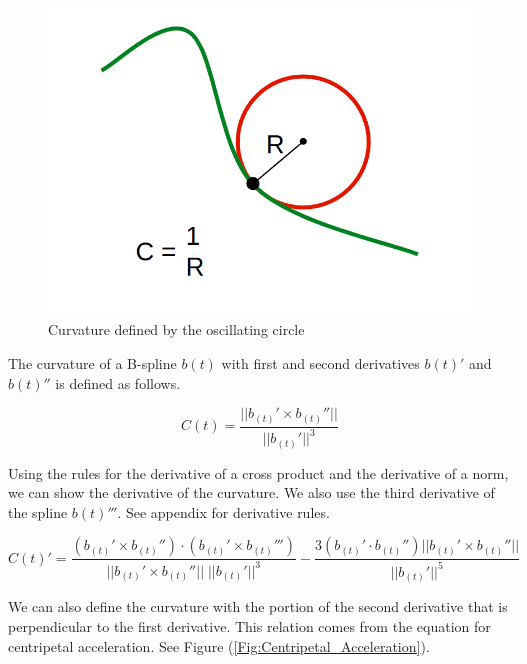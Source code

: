 \documentclass{article}
\begin{document}
\begin{figure}[h]
\begin{center}
\includegraphics[scale=.23]{Curvature.png}
\end{center}
\caption{Curvature defined by the oscillating circle}
\label{Fig:Curvature}
\end{figure}

The curvature of a B-spline \(b(t)\) with first and second derivatives \(b(t)'\) and \(b(t)''\) is defined as follows.

\begin{equation} \label{eq:curvature}
    C(t) = \frac{||b_{(t)}' \times b_{(t)}''||}{||b_{(t)}'||^3}
\end{equation}

Using the rules for the derivative of a cross product and the derivative of a norm, we can show the derivative of the curvature. We also use the third derivative of the spline \(b(t)'''\). See appendix for derivative rules.

\begin{equation}
    C(t)' = \frac{(b_{(t)}' \times b_{(t)}'') \cdot (b_{(t)}' \times b_{(t)}''')}{||b_{(t)}' \times b_{(t)}''||\;||b_{(t)}'||^3} - \frac{3(b_{(t)}' \cdot b_{(t)}'') || b_{(t)}' \times b_{(t)}''||}{||b_{(t)}'||^5}
\end{equation}


We can also define the curvature with the portion of the second derivative that is perpendicular to the first derivative. This relation comes from the equation for centripetal acceleration. See Figure (\ref{Fig:Centripetal_Acceleration}).
\end{document}
